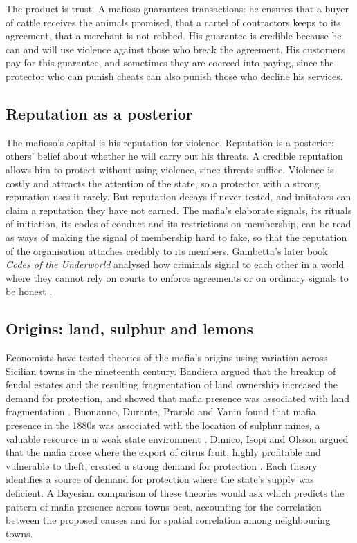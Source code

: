 The product is trust. A mafioso guarantees transactions: he ensures that a buyer of cattle receives the animals promised, that a cartel of contractors keeps to its agreement, that a merchant is not robbed. His guarantee is credible because he can and will use violence against those who break the agreement. His customers pay for this guarantee, and sometimes they are coerced into paying, since the protector who can punish cheats can also punish those who decline his services.

\subsection{Reputation as a posterior}

The mafioso's capital is his reputation for violence. Reputation is a posterior: others' belief about whether he will carry out his threats. A credible reputation allows him to protect without using violence, since threats suffice. Violence is costly and attracts the attention of the state, so a protector with a strong reputation uses it rarely. But reputation decays if never tested, and imitators can claim a reputation they have not earned. The mafia's elaborate signals, its rituals of initiation, its codes of conduct and its restrictions on membership, can be read as ways of making the signal of membership hard to fake, so that the reputation of the organisation attaches credibly to its members. Gambetta's later book \emph{Codes of the Underworld} analysed how criminals signal to each other in a world where they cannot rely on courts to enforce agreements or on ordinary signals to be honest \citep{gambetta2009}.

\subsection{Origins: land, sulphur and lemons}

Economists have tested theories of the mafia's origins using variation across Sicilian towns in the nineteenth century. Bandiera argued that the breakup of feudal estates and the resulting fragmentation of land ownership increased the demand for protection, and showed that mafia presence was associated with land fragmentation \citep{bandiera2003}. Buonanno, Durante, Prarolo and Vanin found that mafia presence in the 1880s was associated with the location of sulphur mines, a valuable resource in a weak state environment \citep{buonanno2015}. Dimico, Isopi and Olsson argued that the mafia arose where the export of citrus fruit, highly profitable and vulnerable to theft, created a strong demand for protection \citep{dimico2017}. Each theory identifies a source of demand for protection where the state's supply was deficient. A Bayesian comparison of these theories would ask which predicts the pattern of mafia presence across towns best, accounting for the correlation between the proposed causes and for spatial correlation among neighbouring towns.


